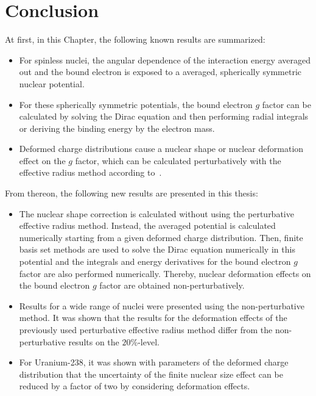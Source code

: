 \clearpage
\section{Conclusion}
At first, in this Chapter, the following known results are summarized:
\begin{itemize}
\item For spinless nuclei, the angular dependence of the interaction energy averaged out and the bound electron is exposed to a averaged, spherically symmetric nuclear potential.
\item For these spherically symmetric potentials, the bound electron $g$ factor can be calculated by solving the Dirac equation and then performing radial integrals or deriving the binding energy by the electron mass.
\item Deformed charge distributions cause a nuclear shape or nuclear deformation effect on the $g$ factor, which can be calculated perturbatively with the effective radius method according to~\cite{jacek2012}.
\end{itemize}
From thereon, the following new results are presented in this thesis:
\begin{itemize}
\item The nuclear shape correction is calculated without using the perturbative effective radius method. Instead, the averaged potential is calculated numerically starting from a given deformed charge distribution. Then, finite basis set methods are used to solve the Dirac equation numerically in this potential and the integrals and energy derivatives for the bound electron $g$ factor are also performed numerically. Thereby, nuclear deformation effects on the bound electron $g$ factor are obtained non-perturbatively.
\item Results for a wide range of nuclei were presented using the non-perturbative method. It was shown that the results for the deformation effects of the previously used perturbative effective radius method differ from the non-perturbative results on the $20\%$-level.
\item For Uranium-238, it was shown with parameters of the deformed charge distribution that the uncertainty of the finite nuclear size effect can be reduced by a factor of two by considering deformation effects. 
\end{itemize}


